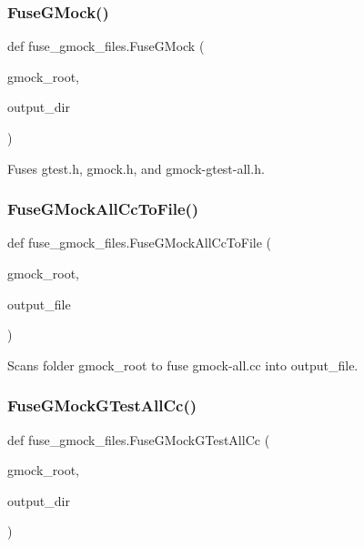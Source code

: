 \subsubsection{\texorpdfstring{Fuse\+G\+Mock()}{FuseGMock()}}
{\footnotesize\ttfamily def fuse\+\_\+gmock\+\_\+files.\+Fuse\+G\+Mock (\begin{DoxyParamCaption}\item[{}]{gmock\+\_\+root,  }\item[{}]{output\+\_\+dir }\end{DoxyParamCaption})}

\begin{DoxyVerb}Fuses gtest.h, gmock.h, and gmock-gtest-all.h.\end{DoxyVerb}
 \mbox{\label{namespacefuse__gmock__files_af470a39a4df492b1ca0d9493eac8222b}} 
\subsubsection{\texorpdfstring{Fuse\+G\+Mock\+All\+Cc\+To\+File()}{FuseGMockAllCcToFile()}}
{\footnotesize\ttfamily def fuse\+\_\+gmock\+\_\+files.\+Fuse\+G\+Mock\+All\+Cc\+To\+File (\begin{DoxyParamCaption}\item[{}]{gmock\+\_\+root,  }\item[{}]{output\+\_\+file }\end{DoxyParamCaption})}

\begin{DoxyVerb}Scans folder gmock_root to fuse gmock-all.cc into output_file.\end{DoxyVerb}
 \mbox{\label{namespacefuse__gmock__files_a50eb499fcb075e19191e8403bd85c813}} 
\subsubsection{\texorpdfstring{Fuse\+G\+Mock\+G\+Test\+All\+Cc()}{FuseGMockGTestAllCc()}}
{\footnotesize\ttfamily def fuse\+\_\+gmock\+\_\+files.\+Fuse\+G\+Mock\+G\+Test\+All\+Cc (\begin{DoxyParamCaption}\item[{}]{gmock\+\_\+root,  }\item[{}]{output\+\_\+dir }\end{DoxyParamCaption})}

